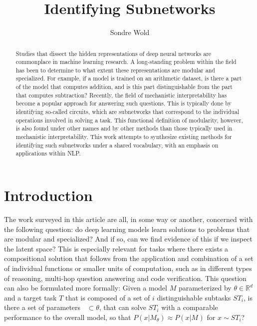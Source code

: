 \documentclass[11pt]{article}
\title{Identifying Subnetworks}
\author{Sondre Wold}
\DeclareMathOperator*{\subnetwork}{\hat{\theta}}
\begin{document}
\maketitle

\begin{abstract}
\noindent
Studies that dissect the hidden representations of deep neural networks are commonplace in machine learning research. A long-standing problem within the field has been to determine to what extent these representations are modular and specialized. For example, if a model is trained on an arithmetic dataset, is there a part of the model that computes addition, and is this part  distinguishable from the part that computes subtraction? Recently, the field of mechanistic interpretability has become a popular approach for answering such questions. This is typically done by identifying so-called circuits, which are subnetworks that correspond to the individual operations involved in solving a task. This functional definition of modularity, however, is also found under other names and by other methods than those typically used in mechanistic interpretability. This work attempts to synthesize existing methods for identifying such subnetworks under a shared vocabulary, with an emphasis on applications within NLP.
\end{abstract}

\section{Introduction}

The work surveyed in this article are all, in some way or another, concerned with the following question: do deep learning models learn solutions to problems that are modular and specialized? And if so, can we find evidence of this if we inspect the latent space? This is especially relevant for tasks where there exists a compositional solution that follows from the application and combination of a set of individual functions or smaller units of computation, such as in different types of reasoning, multi-hop question answering and code verification. This question can also be formulated more formally: Given a model $M$ parameterized by $\theta \in \mathbb{R}^d$ and a target task $T$ that is composed of a set of $i$ distinguishable subtasks $ST_i$, is there a set of parameters $\subnetwork \subset \theta$, that can solve $ST_i$ with a comparable performance to the overall model, so that $P(x | M_\theta) \approx P(x | M_{\subnetwork})$ for $x \sim ST_i$? 
\end{document}
